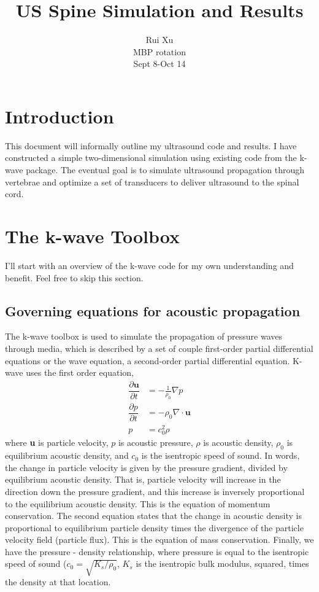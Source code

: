 \documentclass[10pt,a4paper]{article}
\title{US Spine Simulation and Results}
\author{Rui Xu \\ MBP rotation\\ Sept 8-Oct 14}
\begin{document}
\maketitle
 \newpage

\section*{Introduction}

This document will informally outline my ultrasound code and results. I have constructed a simple two-dimensional simulation using existing code from the k-wave package. The eventual goal is to simulate ultrasound propagation through vertebrae and optimize a set of transducers to deliver ultrasound to the spinal cord. 

\section*{The k-wave Toolbox}

I'll start with an overview of the k-wave code for my own understanding and benefit. Feel free to skip this section. 

\subsection*{Governing equations for acoustic propagation}

The k-wave toolbox is used to simulate the propagation of pressure waves through media, which is described by a set of couple first-order partial differential equations or the wave equation, a second-order partial differential equation. K-wave uses the first order equation, 
\begin{align}
\dfrac{\partial \textbf{u}}{\partial t} &= - \frac{1}{\rho_0} \nabla p\\
\dfrac{\partial p }{\partial t} &= - \rho_0 \nabla \cdot \textbf{u}\\
p &= c_0^2 \rho
\end{align}
where \textbf{u} is particle velocity, $p$ is acoustic pressure, $\rho$ is acoustic density, $\rho_0$ is equilibrium acoustic density, and $c_0$ is the isentropic speed of sound. In words, the change in particle velocity is given by the pressure gradient, divided by equilibrium acoustic density. That is, particle velocity will increase in the direction down the pressure gradient, and this increase is inversely proportional to the equilibrium acoustic density. This is the equation of momentum conservation. The second equation states that the change in acoustic density is proportional to equilibrium particle density times the divergence of the particle velocity field (particle flux). This is the equation of mass conservation. Finally, we have the pressure - density relationship, where pressure is equal to the isentropic speed of sound ($c_0 = \sqrt{K_s/\rho_0}$, $K_s$ is the isentropic bulk modulus, squared, times the density at that location. 
\end{document}
